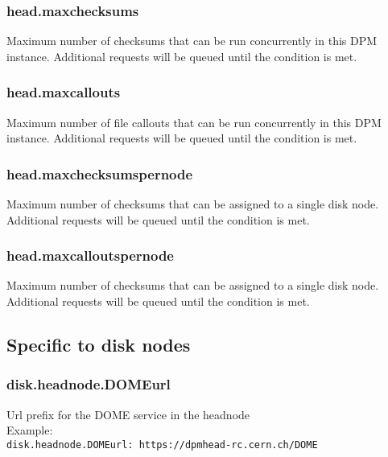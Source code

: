 \documentclass[a4paper,10pt]{scrreprt}
\begin{document}
\subsubsection{head.maxchecksums}

Maximum number of checksums that can be run concurrently in this DPM instance. Additional requests will be queued until the condition is met.\\

\subsubsection{head.maxcallouts}

Maximum number of file callouts that can be run concurrently in this DPM instance. Additional requests will be queued until the condition is met.\\

\subsubsection{head.maxchecksumspernode}

Maximum number of checksums that can be assigned to a single disk node. Additional requests will be queued until the condition is met.\\

\subsubsection{head.maxcalloutspernode}

Maximum number of checksums that can be assigned to a single disk node. Additional requests will be queued until the condition is met.\\

\subsection{Specific to disk nodes}

\subsubsection{disk.headnode.DOMEurl}
Url prefix for the DOME service in the headnode\\

Example:\\
\lstinline"disk.headnode.DOMEurl: https://dpmhead-rc.cern.ch/DOME"\\
\end{document}
